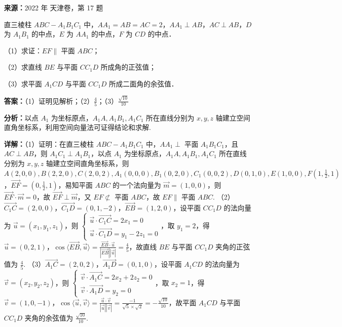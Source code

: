 \begin{question}[points=15]
\textbf{来源：}2022 年 天津卷，第 17 题\par
直三棱柱 $ABC-A_1B_1C_1$ 中，$AA_1=AB=AC=2$，$AA_1\perp AB$，$AC\perp AB$，$D$ 为 $A_1B_1$ 的中点，$E$ 为 $AA_1$ 的中点，$F$ 为 $CD$ 的中点．

（1）求证：$EF\parallel$ 平面 $ABC$；

（2）求直线 $BE$ 与平面 $CC_1D$ 所成角的正弦值；

（3）求平面 $A_1CD$ 与平面 $CC_1D$ 所成二面角的余弦值．
\begin{solution}
\textbf{答案：}（1）证明见解析；（2）$\frac{4}{5}$；（3）$\frac{\sqrt{10}}{10}$

\textbf{分析：}以点 $A_1$ 为坐标原点，$A_1A,A_1B_1,A_1C_1$ 所在直线分别为 $x,y,z$ 轴建立空间直角坐标系，利用空间向量法可证得结论和求解.

\textbf{详解：}（1）证明：在直三棱柱 $ABC-A_1B_1C_1$ 中，$AA_1\perp$ 平面 $A_1B_1C_1$，且 $AC\perp AB$，则 $A_1C_1\perp A_1B_1$，以点 $A_1$ 为坐标原点，$A_1A,A_1B_1,A_1C_1$ 所在直线分别为 $x,y,z$ 轴建立空间直角坐标系，则 $A(2,0,0),B(2,2,0),C(2,0,2),A_1(0,0,0),B_1(0,2,0),C_1(0,0,2),D(0,1,0),E(1,0,0),F(1,\frac{1}{2},1)$，$\overrightarrow{EF}=(0,\frac{1}{2},1)$，易知平面 $ABC$ 的一个法向量为 $\vec{m}=(1,0,0)$，则 $\overrightarrow{EF}\cdot\vec{m}=0$，故 $\overrightarrow{EF}\perp\vec{m}$，又 $EF\not\subset$ 平面 $ABC$，故 $EF\parallel$ 平面 $ABC$.
（2）$\overrightarrow{C_1C}=(2,0,0)$，$\overrightarrow{C_1D}=(0,1,-2)$，$\overrightarrow{EB}=(1,2,0)$，设平面 $CC_1D$ 的法向量为 $\vec{u}=(x_1,y_1,z_1)$，则 $\begin{cases} \vec{u}\cdot\overrightarrow{C_1C}=2x_1=0 \\ \vec{u}\cdot\overrightarrow{C_1D}=y_1-2z_1=0 \end{cases}$，取 $y_1=2$，得 $\vec{u}=(0,2,1)$，$\cos\langle\overrightarrow{EB},\vec{u}\rangle=\frac{\overrightarrow{EB}\cdot\vec{u}}{|\overrightarrow{EB}||\vec{u}|}=\frac{4}{5}$，故直线 $BE$ 与平面 $CC_1D$ 夹角的正弦值为 $\frac{4}{5}$.
（3）$\overrightarrow{A_1C}=(2,0,2)$，$\overrightarrow{A_1D}=(0,1,0)$，设平面 $A_1CD$ 的法向量为 $\vec{v}=(x_2,y_2,z_2)$，则 $\begin{cases} \vec{v}\cdot\overrightarrow{A_1C}=2x_2+2z_2=0 \\ \vec{v}\cdot\overrightarrow{A_1D}=y_2=0 \end{cases}$，取 $x_2=1$，得 $\vec{v}=(1,0,-1)$，$\cos\langle\vec{u},\vec{v}\rangle=\frac{\vec{u}\cdot\vec{v}}{|\vec{u}||\vec{v}|}=\frac{-1}{\sqrt{5}\times\sqrt{2}}=-\frac{\sqrt{10}}{10}$，故平面 $A_1CD$ 与平面 $CC_1D$ 夹角的余弦值为 $\frac{\sqrt{10}}{10}$.
\end{solution}
\end{question}


